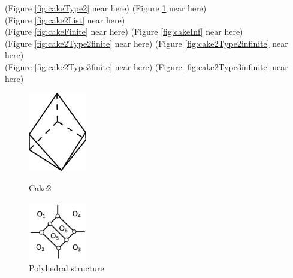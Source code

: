 \documentclass[suppldata, dvipdfmx]{interact}
\theoremstyle{plain}%
\theoremstyle{definition}
\theoremstyle{remark}
\theoremstyle{problemstyle}
\begin{document}
\noindent(Figure \ref{fig:cakeType2} near here)
(Figure \ref{fig:polyhedralStructureCake2} near here)\\
(Figure \ref{fig:cake2List}
 near here)\\
(Figure \ref{fig:cakeFinite}
 near here)
(Figure \ref{fig:cakeInf}
 near here)\\
(Figure \ref{fig:cake2Type2finite}
 near here)
(Figure \ref{fig:cake2Type2infinite}
 near here)\\
(Figure \ref{fig:cake2Type3finite}
 near here)
(Figure \ref{fig:cake2Type3infinite}
 near here)

\begin{figure}[h!tbp]
  \begin{minipage}[t]{0.49\textwidth}
   \centering
   \includegraphics[width=1in, keepaspectratio]{./img/HexahedraWithSphericalFaces/hexahedralCake2/cake2.jpg}
   \caption{Cake2}
   \label{fig:cakeType2}
  \end{minipage}
 \hspace*{\fill}
  \begin{minipage}[t]{0.49\textwidth}
   \centering
   \includegraphics[width=1in, keepaspectratio]{./img/HexahedraWithSphericalFaces/hexahedralCake2/faces.jpg}
   \caption{Polyhedral structure}
   \label{fig:polyhedralStructureCake2}
  \end{minipage}
\end{figure}
\end{document}

